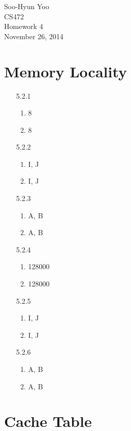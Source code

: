 \documentclass[12pt,letterpaper]{article}
\begin{document}
Soo-Hyun Yoo \\
CS472 \\
Homework 4 \\
November 26, 2014

\section*{Memory Locality}

\begin{enumerate}
    \item[5.2.1]
        \begin{enumerate}
            \item 8
            \item 8
        \end{enumerate}
    \item[5.2.2]
        \begin{enumerate}
            \item I, J
            \item I, J
        \end{enumerate}
    \item[5.2.3]
        \begin{enumerate}
            \item A, B
            \item A, B
        \end{enumerate}
    \item[5.2.4]
        \begin{enumerate}
            \item 128000
            \item 128000
        \end{enumerate}
    \item[5.2.5]
        \begin{enumerate}
            \item I, J
            \item I, J
        \end{enumerate}
    \item[5.2.6]
        \begin{enumerate}
            \item A, B
            \item A, B
        \end{enumerate}
\end{enumerate}


\section*{Cache Table}
\end{document}
